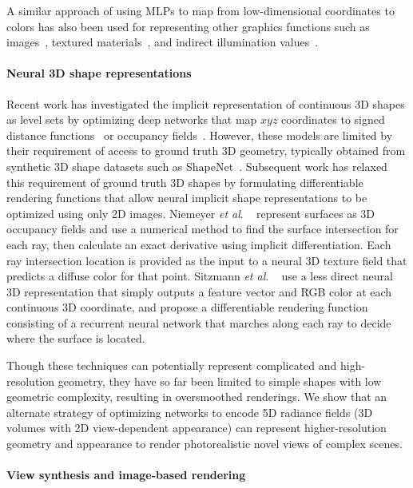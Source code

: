 \documentclass[runningheads]{llncs}
\newcommand{\etal}{\textit{et al}. }
\newcommand{\posxyz}{xyz}
\begin{document}
A similar approach of using MLPs to map from low-dimensional coordinates to colors has also been used for representing other graphics functions such as images~\cite{stanley2007compositional}, textured materials~\cite{henzler20,texturefields,rainer20,rainer19}, and indirect illumination values~\cite{rrf}.

\paragraph{\textbf{Neural 3D shape representations}}

Recent work has investigated the implicit representation of continuous 3D shapes as level sets by optimizing deep networks that map $\posxyz$ coordinates to signed distance functions~\cite{jiang2020,deepsdf} or occupancy fields~\cite{genova2020,occupancynet}. However, these models are limited by their requirement of access to ground truth 3D geometry, typically obtained from synthetic 3D shape datasets such as ShapeNet~\cite{shapenet}. 
Subsequent work has relaxed this requirement of ground truth 3D shapes by formulating differentiable rendering functions that allow neural implicit shape representations to be optimized using only 2D images. Niemeyer \etal~\cite{diffvolumetric} represent surfaces as 3D occupancy fields and use a numerical method to find the surface intersection for each ray, then calculate an exact derivative using implicit differentiation. Each ray intersection location is provided as the input to a neural 3D texture field that predicts a diffuse color for that point. Sitzmann \etal~\cite{srn} use a less direct neural 3D representation that simply outputs a feature vector and RGB color at each continuous 3D coordinate, and propose a differentiable rendering function consisting of a recurrent neural network that marches along each ray to decide where the surface is located.

Though these techniques can potentially represent complicated and high-resolution geometry, they have so far been limited to simple shapes with low geometric complexity, resulting in oversmoothed renderings. We show that an alternate strategy of optimizing networks to encode 5D radiance fields (3D volumes with 2D view-dependent appearance) can represent higher-resolution geometry and appearance to render photorealistic novel views of complex scenes.

\paragraph{\textbf{View synthesis and image-based rendering}}
\end{document}
